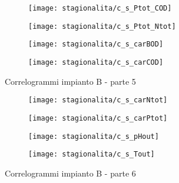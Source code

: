 \begin{sidewaysfigure}[h]\ContinuedFloat
	\renewcommand*\thesubfigure{(\arabic{subfigure})}
	\begin{subfigure}{0.49\textwidth}
		\texttt{[image: stagionalita/c\_s\_Ptot\_COD]}
		\caption{}
		\centering
	\end{subfigure}
	\begin{subfigure}{0.49\textwidth}
		\texttt{[image: stagionalita/c\_s\_Ptot\_Ntot]}
		\caption{}
		\centering
	\end{subfigure}

	\begin{subfigure}{0.49\textwidth}
		\texttt{[image: stagionalita/c\_s\_carBOD]}
		\caption{}
		\centering
	\end{subfigure}
	\begin{subfigure}{0.49\textwidth}
		\texttt{[image: stagionalita/c\_s\_carCOD]}	
		\caption{}
		\centering
	\end{subfigure}
	\caption{Correlogrammi impianto B - parte 5}
\end{sidewaysfigure}

\clearpage

\begin{sidewaysfigure}[h]\ContinuedFloat
	\renewcommand*\thesubfigure{(\arabic{subfigure})}
	\begin{subfigure}{0.49\textwidth}
		\texttt{[image: stagionalita/c\_s\_carNtot]}
		\caption{}
		\centering
	\end{subfigure}
	\begin{subfigure}{0.49\textwidth}
		\texttt{[image: stagionalita/c\_s\_carPtot]}
		\caption{}
		\centering
	\end{subfigure}

	\begin{subfigure}{0.49\textwidth}
		\texttt{[image: stagionalita/c\_s\_pHout]}
		\caption{}
		\centering
	\end{subfigure}
	\begin{subfigure}{0.49\textwidth}
		\texttt{[image: stagionalita/c\_s\_Tout]}	
		\caption{}
		\label{fig:c_s_Tout}
		\centering
	\end{subfigure}
	\caption{Correlogrammi impianto B - parte 6}
\end{sidewaysfigure}

\clearpage

